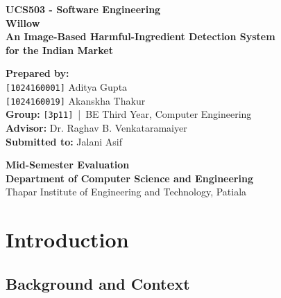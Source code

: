 \documentclass{report}
\begin{document}
\begin{titlepage}
    \centering
    \vspace*{0.5cm}
    
    {\small\bfseries\color{navy} UCS503 - Software Engineering}\\[1.5cm]
    
    {\Huge\bfseries\color{navy} Willow}\\[0.5cm]
    {\large\bfseries An Image-Based Harmful-Ingredient Detection System\\for the Indian Market}\\[2cm]
    
    \begin{minipage}{0.85\textwidth}
        \centering
        \textbf{Prepared by:}\\[0.2cm]
        \texttt{[1024160001]} Aditya Gupta \\
        \texttt{[1024160019]} Akanskha Thakur\\[0.6cm]
        
        \textbf{Group:} \texttt{[3p11]} \,|\, BE Third Year, Computer Engineering\\[0.6cm]
        
        \textbf{Advisor:} Dr. Raghav B. Venkataramaiyer\\[0.6cm]
        
        \textbf{Submitted to:} Jalani Asif
    \end{minipage}
    
    \vfill
    
    {\large\bfseries Mid-Semester Evaluation}\\[0.2cm]
    {\bfseries Department of Computer Science and Engineering}\\[0.15cm]
    Thapar Institute of Engineering and Technology, Patiala
    
    \vspace*{0.5cm}
\end{titlepage}

\newpage
\thispagestyle{plain}
\tableofcontents
\newpage


\chapter{Introduction}

\section{Background and Context}
\end{document}
